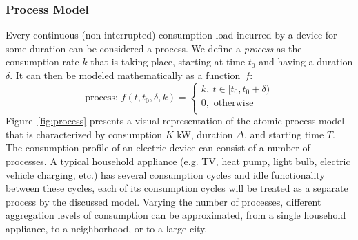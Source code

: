 \documentclass[conference]{IEEEtran}
\begin{document}
\subsubsection{Process Model}
Every continuous (non-interrupted) consumption load incurred by a device for some duration can be considered a process.  We define a \emph{process} as the consumption rate $k$ that is taking place, starting at time $t_0$ and having a duration $\delta$. It can then be modeled mathematically as a function~$f$:
\begin{equation}
\text{process: }f(t, t_0, \delta, k) =
\left\lbrace
\begin{array}{l}
 k,~t \in [t_0, t_0+\delta)\\
 0, \text{ otherwise}\\
\end{array}
\right.
\end{equation}
Figure~\ref{fig:process} presents a visual representation of the atomic process model that is characterized by consumption $K$ kW, duration $\Delta$, and starting time $T$. The consumption profile of an electric device can consist of a number of processes. A typical household appliance (e.g. TV, heat pump, light bulb, electric vehicle charging, etc.) has several consumption cycles and idle functionality between these cycles, each of its consumption cycles will be treated as a separate process by the discussed model. Varying the number of processes, different aggregation levels of consumption can be approximated, from a single household appliance, to a neighborhood, or to a large city.
\end{document}
